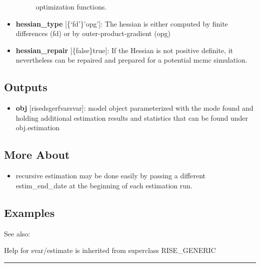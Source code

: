 \documentclass[letterpaper,10pt,english]{sphinxmanual}
\begin{document}
\begin{itemize}
\begin{description}
\begin{itemize}
\end{itemize}

optimization functions.

\end{description}

\item {} 
\textbf{hessian\_type} {[}\{`fd'\}\textbar{}'opg'{]}: The hessian is either computed by
finite differences (fd) or by outer-product-gradient (opg)

\item {} 
\textbf{hessian\_repair} {[}\{false\}\textbar{}true{]}: If the Hessian is not positive
definite, it nevertheless can be repaired and prepared for a potential
mcmc simulation.

\end{itemize}


\subsection{Outputs}
\label{classes/models/@svar/svar:id13}\begin{itemize}
\item {} 
\textbf{obj} {[}rise\textbar{}dsge\textbar{}rfvar\textbar{}svar{]}: model object parameterized with the
mode found and holding additional estimation results and statistics
that can be found under obj.estimation

\end{itemize}


\subsection{More About}
\label{classes/models/@svar/svar:id14}\begin{itemize}
\item {} 
recursive estimation may be done easily by passing a different
estim\_end\_date at the beginning of each estimation run.

\end{itemize}


\subsection{Examples}
\label{classes/models/@svar/svar:id15}
See also:

Help for svar/estimate is inherited from superclass RISE\_GENERIC


\bigskip\hrule{}\bigskip
\end{document}
